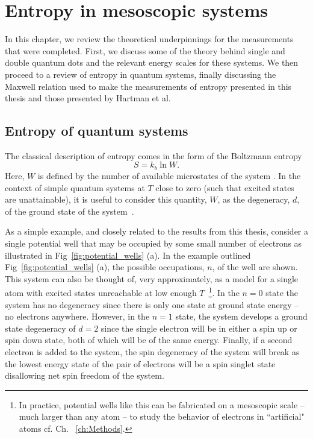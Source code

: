 
\chapter{Entropy in mesoscopic systems}
\label{ch:Theory}

In this chapter, we review the theoretical underpinnings for the measurements that were completed. First, we discuss some of the theory behind single and double quantum dots and the relevant energy scales for these systems. We then proceed to a review of entropy in quantum systems, finally discussing the Maxwell relation used to make the measurements of entropy presented in this thesis and those presented by Hartman et al.

\section{Entropy of quantum systems}
The classical description of entropy comes in the form of the Boltzmann entropy
\begin{equation}
	\label{eqn:b_entropy}
	S = k_b \ln W.
\end{equation}
Here, $W$ is defined by the number of available microstates of the system \cite{schroeder}. In the context of simple quantum systems at $T$ close to zero (such that excited states are unattainable), it is useful to consider this quantity, $W$, as the degeneracy, $d$, of the ground state of the system~\cite{mcquarrie}. 

As a simple example, and closely related to the results from this thesis, consider a single potential well that may be occupied by some small number of electrons as illustrated in Fig~\ref{fig:potential_wells} (a).  In the example outlined Fig~\ref{fig:potential_wells} (a), the possible occupations, $n$, of the well are shown. This system can also be thought of, very approximately, as a model for a single atom with excited states unreachable at low enough $T$~\footnote{In practice, potential wells like this can be fabricated on a mesoscopic scale -- much larger than any atom -- to study the behavior of electrons in ``artificial" atoms cf. Ch. ~\ref{ch:Methods}.}. In the $n = 0$ state the system has no degeneracy since there is only one state at ground state energy -- no electrons anywhere. However, in the $n=1$ state, the system develops a ground state degeneracy of $d = 2$ since the single electron will be in either a spin up or spin down state, both of which will be of the same energy. Finally, if a second electron is added to the system, the spin degeneracy of the system will break as the lowest energy state of the pair of electrons will be a spin singlet state disallowing net spin freedom of the system. 

